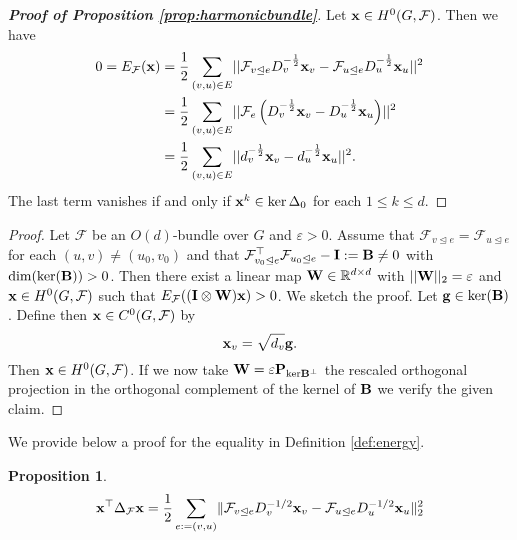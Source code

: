 \documentclass{article}
\newtheorem{proposition}[theorem]{Proposition}
\def\vg{{\bf{g}}}
\def\vx{{\bf{x}}}
\def\mB{{\bf{B}}}
\def\mI{{\bf{I}}}
\def\mP{{\bf{P}}}
\def\mW{{\bf{W}}}
\def\gF{{\mathcal{F}}}
\newcommand{\tleq}{\trianglelefteq}
\DeclarePairedDelimiter{\norm}{\lVert}{\rVert}
\begin{document}
\begin{proof}[\textbf{Proof of Proposition \ref{prop:harmonicbundle}}] Let $\vx \in H^{0}(G,\mathcal{F})$. Then we have
\begin{align*}
0 = E_\gF(\vx) &= \frac{1}{2}\sum_{(v,u)\in E}\lvert\lvert \mathcal{F}_{v\tleq e}D_v^{-\frac{1}{2}}\vx_v- \mathcal{F}_{u\tleq e}D_u^{-\frac{1}{2}}\vx_u\rvert\rvert^{2} \\
&= \frac{1}{2}\sum_{(v,u)\in E}\lvert\lvert \mathcal{F}_{e}\left(D_v^{-\frac{1}{2}}\vx_v - D_u^{-\frac{1}{2}}\vx_u\right)\rvert\rvert^{2}
\\
&= \frac{1}{2}\sum_{(v,u)\in E}\lvert\lvert d_{v}^{-\frac{1}{2}}\vx_v- d_{u}^{-\frac{1}{2}}\vx_u\rvert\rvert^{2}. 
\end{align*}
\noindent The last term vanishes if and only if $\vx^{k}\in\text{ker}\,\Delta_{0}$ for each $1\leq k\leq d$.
\end{proof}


\SCNEnergyIncrease*

\begin{proof}
Let $\mathcal{F}$ be an $O(d)$-bundle over $G$ and $\varepsilon > 0$. Assume that $\mathcal{F}_{v\tleq e} = \mathcal{F}_{u\tleq e}$ for each $(u,v) \neq (u_{0},v_{0})$ and that $\mathcal{F}_{v_{0}\tleq e}^\top\mathcal{F}_{u_{0}\tleq e} - \mI := \mB \neq 0$ with $\mathrm{dim}(\mathrm{ker}(\mB)) > 0$. Then there exist a linear map $\mW\in\mathbb{R}^{d\times d}$ with $\lvert\lvert \mW \rvert\rvert_{2} = \varepsilon$ and $\vx \in H^{0}(G,\mathcal{F})$ such that $E_\gF((\mI\otimes \mW) \vx) > 0$. We sketch the proof. Let $\vg \in \mathrm{ker}(\mB)$. Define then $\vx \in C^{0}(G,\gF)$ by
\[
\vx_v = \sqrt{d_{v}} \vg.
\]
\noindent Then $\vx \in H^{0}(G,\mathcal{F})$. If we now take $\mW = \varepsilon \mP_{\text{ker}\mB^\perp}$ the rescaled orthogonal projection in the orthogonal complement of the kernel of $\mB$ we verify the given claim.
\end{proof}

We provide below a proof for the equality in Definition \ref{def:energy}. 
\begin{proposition}
$$\vx^\top \Delta_\gF \vx = \frac{1}{2} \sum_{e:=(v, u)} \norm{\gF_{v \tleq e}D_v^{-1/2}\vx_v - \gF_{u \tleq e}D_u^{-1/2}\vx_u}_2^2 $$
\end{proposition}
\end{document}
